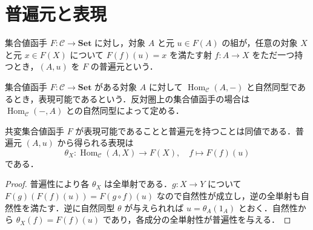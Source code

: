 \section{普遍元と表現}
\begin{defn}[普遍元]
集合値函手 $F:\mathcal C\to\mathbf{Set}$ に対し，対象 $A$ と元 $u\in F(A)$ の組が，任意の対象 $X$ と元 $x\in F(X)$ について $F(f)(u)=x$ を満たす射 $f:A\to X$ をただ一つ持つとき，$(A,u)$ を $F$ の普遍元という．
\end{defn}
\begin{defn}[表現可能函手]
集合値函手 $F:\mathcal C\to\mathbf{Set}$ がある対象 $A$ に対して $\operatorname{Hom}_{\mathcal C}(A,-)$ と自然同型であるとき，表現可能であるという．反対圏上の集合値函手の場合は $\operatorname{Hom}_{\mathcal C}(-,A)$ との自然同型によって定める．
\end{defn}
\begin{prop}[普遍元と表現可能性]
共変集合値函手 $F$ が表現可能であることと普遍元を持つことは同値である．普遍元 $(A,u)$ から得られる表現は
\[
 \theta_X:\operatorname{Hom}_{\mathcal C}(A,X)\to F(X),
 \quad f\mapsto F(f)(u)
\]
である．
\end{prop}
\begin{proof}
普遍性により各 $\theta_X$ は全単射である．$g:X\to Y$ について $F(g)(F(f)(u))=F(g\circ f)(u)$ なので自然性が成立し，逆の全単射も自然性を満たす．逆に自然同型 $\theta$ が与えられれば $u=\theta_A(1_A)$ とおく．自然性から $\theta_X(f)=F(f)(u)$ であり，各成分の全単射性が普遍性を与える．
\end{proof}
